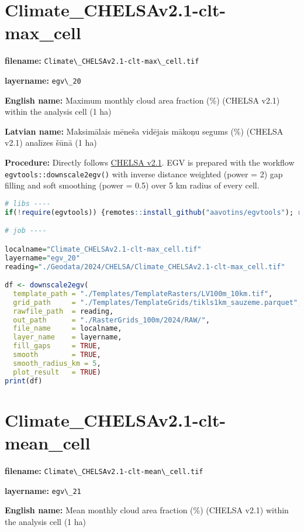 \documentclass[
]{book}
\newcommand{\passthrough}[1]{#1}
\begin{document}
\section{Climate\_CHELSAv2.1-clt-max\_cell}\label{ch06.020}

\textbf{filename:} \passthrough{\lstinline!Climate\_CHELSAv2.1-clt-max\_cell.tif!}

\textbf{layername:} \passthrough{\lstinline!egv\_20!}

\textbf{English name:} Maximum monthly cloud area fraction (\%) (CHELSA v2.1) within the analysis cell (1 ha)

\textbf{Latvian name:} Maksimālais mēneša vidējais mākoņu segums (\%) (CHELSA v2.1) analīzes šūnā (1 ha)

\textbf{Procedure:} Directly follows \hyperref[Ch04.11]{CHELSA v2.1}. EGV is prepared with the
workflow \passthrough{\lstinline!egvtools::downscale2egv()!} with inverse distance weighted (power = 2)
gap filling and soft smoothing (power = 0.5) over 5 km radius of every cell.

\begin{lstlisting}[language=R]
# libs ----
if(!require(egvtools)) {remotes::install_github("aavotins/egvtools"); require(egvtools)}

# job ----

localname="Climate_CHELSAv2.1-clt-max_cell.tif"
layername="egv_20"
reading="./Geodata/2024/CHELSA/Climate_CHELSAv2.1-clt-max_cell.tif"

df <- downscale2egv(
  template_path = "./Templates/TemplateRasters/LV100m_10km.tif",
  grid_path     = "./Templates/TemplateGrids/tikls1km_sauzeme.parquet",
  rawfile_path  = reading,
  out_path      = "./RasterGrids_100m/2024/RAW/",
  file_name     = localname,
  layer_name    = layername,
  fill_gaps     = TRUE,
  smooth        = TRUE,
  smooth_radius_km = 5,
  plot_result   = TRUE)
print(df)
\end{lstlisting}

\section{Climate\_CHELSAv2.1-clt-mean\_cell}\label{ch06.021}

\textbf{filename:} \passthrough{\lstinline!Climate\_CHELSAv2.1-clt-mean\_cell.tif!}

\textbf{layername:} \passthrough{\lstinline!egv\_21!}

\textbf{English name:} Mean monthly cloud area fraction (\%) (CHELSA v2.1) within the analysis cell (1 ha)
\end{document}
